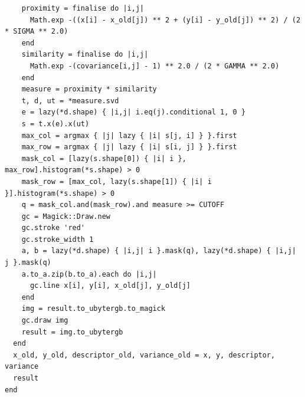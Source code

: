 \documentclass[12pt,a4paper,oneside,openright]{book}
\begin{document}
\begin{CJK}{UTF8}{}
\begin{lstlisting}
    proximity = finalise do |i,j|
      Math.exp -((x[i] - x_old[j]) ** 2 + (y[i] - y_old[j]) ** 2) / (2 * SIGMA ** 2.0)
    end
    similarity = finalise do |i,j|
      Math.exp -(covariance[i,j] - 1) ** 2.0 / (2 * GAMMA ** 2.0)
    end
    measure = proximity * similarity
    t, d, ut = *measure.svd
    e = lazy(*d.shape) { |i,j| i.eq(j).conditional 1, 0 }
    s = t.x(e).x(ut)
    max_col = argmax { |j| lazy { |i| s[j, i] } }.first
    max_row = argmax { |j| lazy { |i| s[i, j] } }.first
    mask_col = [lazy(s.shape[0]) { |i| i }, max_row].histogram(*s.shape) > 0
    mask_row = [max_col, lazy(s.shape[1]) { |i| i }].histogram(*s.shape) > 0
    q = mask_col.and(mask_row).and measure >= CUTOFF
    gc = Magick::Draw.new
    gc.stroke 'red'
    gc.stroke_width 1
    a, b = lazy(*d.shape) { |i,j| i }.mask(q), lazy(*d.shape) { |i,j| j }.mask(q)
    a.to_a.zip(b.to_a).each do |i,j|
      gc.line x[i], y[i], x_old[j], y_old[j]
    end
    img = result.to_ubytergb.to_magick
    gc.draw img
    result = img.to_ubytergb
  end
  x_old, y_old, descriptor_old, variance_old = x, y, descriptor, variance
  result
end
\end{lstlisting}

\newpage
\backmatter
% 



\end{CJK}
\end{document}
